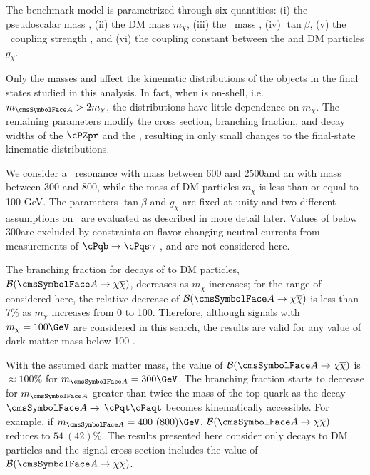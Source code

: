 The benchmark model is parametrized through six quantities: (i) the 
pseudoscalar mass 
\maz, (ii) the DM mass $m_{\chi}$, (iii) the \cPZpr\ mass \mzp,
(iv) $\tan \beta$, (v) the \cPZpr\ coupling strength \gzp, and (vi) 
the coupling constant between the \Az and DM particles $g_{\chi}$. 

Only the masses \maz and \mzp affect the kinematic 
distributions of the objects in the final states studied in this analysis. 
In fact, when \Az is on-shell, i.e. $\maz > 2 m_{\chi}$, the distributions 
have little dependence on $m_{\chi}$. 
The remaining parameters modify the cross section, branching fraction, and decay 
widths of the $\cPZpr$ and the \Az, resulting in only small changes to the 
final-state kinematic distributions. 

We consider a \cPZpr\ resonance with mass between 600 and 2500\GeV and 
an \Az with mass between 300 and 800\GeV, while the mass of DM particles $m_{\chi}$ is less than or equal to 100 GeV.
The parameters $\tan \beta$ and $g_{\chi}$ are fixed at unity and two different assumptions on \gzp\ are 
evaluated as described in more detail later. 
Values of \maz below 300\GeV are excluded by constraints on flavor changing 
neutral currents from measurements of $\cPqb\rightarrow \cPqs\gamma$ \cite{Branco:2011iw}, 
and are not considered here. 

The branching fraction for decays of \Az to DM particles, 
${\cal B}(\Az\rightarrow\chi\overline{\chi})$, decreases as $m_{\chi}$ 
increases;                                   
for the range of \maz considered here, the relative decrease of 
${\cal B}(\Az\rightarrow\chi\overline{\chi})$ is less than 7\% as $m_{\chi}$                              
increases from 0 to 100\GeV. 
Therefore, although signals with $m_{\chi}= 100\GeV$ are considered in this search, 
the results are valid for any value of dark matter mass below 100 \GeV.

With the assumed dark matter mass, the value of ${\cal B}(\Az\rightarrow\chi\overline{\chi})$ is ${\approx} 100\%$ for $\maz = 300\GeV$. 
The branching fraction starts to decrease for $\maz$ greater than twice the mass 
of the top quark as the decay $\Az\rightarrow$ $\cPqt\cPaqt$ becomes kinematically 
accessible. For example, if $\maz = 400~(800)\GeV$, ${\cal B}(\Az\rightarrow\chi\overline{\chi})$ 
reduces to $54~(42)\%$. The results presented here consider only \Az decays to 
DM particles and the signal cross section includes 
the value of ${\cal B}(\Az\rightarrow\chi\overline{\chi})$.

